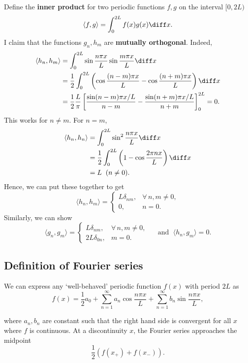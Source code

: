 \documentclass[12pt]{article}
\begin{document}
Define the \textbf{inner product} for two periodic functions $f, g$ on the interval $[0, 2L)$ 
\[
	\langle f, g \rangle = \int_{0}^{2L}f(x) g(x)\diff x
.\]
I claim that the functions $g_n, h_m$ are \textbf{mutually orthogonal}. Indeed,
\begin{align*}
	\langle h_n, h_m \rangle &= \int_{0}^{2L} \sin \frac{n \pi x}{L} \sin \frac{m \pi x}{L}\diff x \\
				 &= \frac{1}{2} \int_{0}^{2L} \left( \cos \frac{(n - m)\pi x}{L} - \cos \frac{(n + m)\pi x}{L}\right)\diff x \\
				 &= \frac{1}{2} \frac{L}{\pi} \left[ \frac{\sin (n - m) \pi x/L}{n - m} - \frac{\sin (n + m) \pi x/L}{n + m} \right]_{0}^{2L} = 0.
\end{align*}
This works for $n \neq m$. For $n = m$,
\begin{align*}
	\langle h_n, h_n \rangle &= \int_{0}^{2L} \sin^2 \frac{n \pi x}{L}\diff x \\
				 &= \frac{1}{2} \int_{0}^{2L} \left( 1 - \cos \frac{2 \pi n x}{L} \right)\diff x \\
				 &= L \;\; (n \neq 0).
\end{align*}
Hence, we can put these together to get
\[
	\langle h_n, h_m \rangle =
	\begin{cases}
		L \delta_{nm}, & \forall\,\! n, m \neq 0, \\
		0, & n = 0.
	\end{cases}
\] 
Similarly, we can show
\[
	\langle g_n, g_m \rangle =
	\begin{cases}
		L \delta_{nm}, & \forall\,\! n, m \neq 0, \\
		2L \delta_{0n}, &m = 0.
	\end{cases}
	\quad \text{ and } \; \langle h_n, g_m \rangle = 0
.\]

\subsection{Definition of Fourier series}%
\label{sub:definition_of_fourier_series}

We can express any `well-behaved' periodic function $f(x)$ with period $2L$ as
\[
	f(x) = \frac{1}{2}a_0  + \sum_{n = 1}^{\infty} a_n \cos \frac{n \pi x}{L} + \sum_{n = 1}^{\infty}b_n \sin \frac{n \pi x}{L}
,\]

where $a_n, b_n$ are constant such that the right hand side is convergent for all $x$ where $f$ is continuous. At a discontinuity $x$, the Fourier series approaches the midpoint
\[
	\frac{1}{2} \left( f(x_{+}) + f(x_{-}) \right)
.\]
\end{document}

